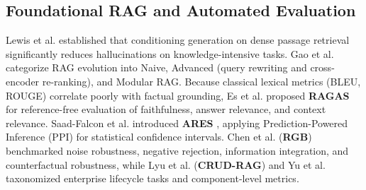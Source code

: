 \documentclass[conference]{IEEEtran}
\begin{document}
\subsection{Foundational RAG and Automated Evaluation}
Lewis et al. \cite{lewis2020rag} established that conditioning generation on dense passage retrieval significantly reduces hallucinations on knowledge-intensive tasks. Gao et al. \cite{gao2023ragsurvey} categorize RAG evolution into Naive, Advanced (query rewriting and cross-encoder re-ranking), and Modular RAG. Because classical lexical metrics (BLEU, ROUGE) correlate poorly with factual grounding, Es et al. proposed \textbf{RAGAS} \cite{es2024ragas} for reference-free evaluation of faithfulness, answer relevance, and context relevance. Saad-Falcon et al. introduced \textbf{ARES} \cite{saadfalcon2024ares}, applying Prediction-Powered Inference (PPI) for statistical confidence intervals. Chen et al. (\textbf{RGB}) \cite{chen2024rgb} benchmarked noise robustness, negative rejection, information integration, and counterfactual robustness, while Lyu et al. (\textbf{CRUD-RAG}) \cite{lyu2024crudrag} and Yu et al. \cite{yu2024evaluation} taxonomized enterprise lifecycle tasks and component-level metrics.
\end{document}
